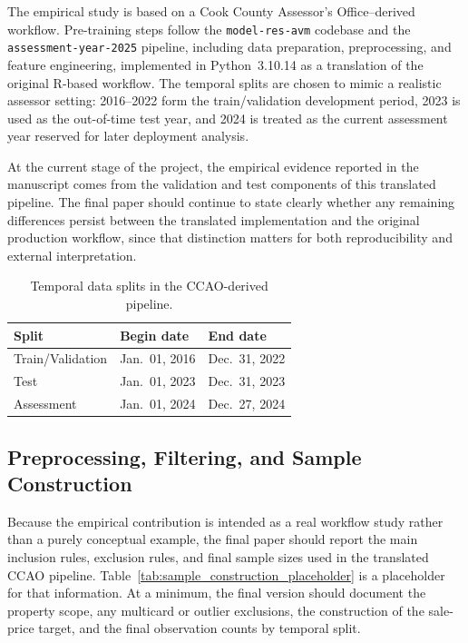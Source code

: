 \documentclass[12pt]{article}
\theoremstyle{plain}
\theoremstyle{definition}
\begin{document}
The empirical study is based on a Cook County Assessor's Office--derived workflow. Pre-training steps follow the \texttt{model-res-avm} codebase and the \texttt{assessment-year-2025} pipeline, including data preparation, preprocessing, and feature engineering, implemented in Python~3.10.14 as a translation of the original R-based workflow. The temporal splits are chosen to mimic a realistic assessor setting: 2016--2022 form the train/validation development period, 2023 is used as the out-of-time test year, and 2024 is treated as the current assessment year reserved for later deployment analysis.

At the current stage of the project, the empirical evidence reported in the manuscript comes from the validation and test components of this translated pipeline. The final paper should continue to state clearly whether any remaining differences persist between the translated implementation and the original production workflow, since that distinction matters for both reproducibility and external interpretation.

\begin{table}[t]
\centering
\caption{Temporal data splits in the CCAO-derived pipeline.}
\label{tab:data_splits}
\begin{tabular}{lll}
\toprule
Split & Begin date & End date \\
\midrule
Train/Validation & Jan.\ 01, 2016 & Dec.\ 31, 2022 \\
Test & Jan.\ 01, 2023 & Dec.\ 31, 2023 \\
Assessment & Jan.\ 01, 2024 & Dec.\ 27, 2024 \\
\bottomrule
\end{tabular}
\end{table}

\subsection{Preprocessing, Filtering, and Sample Construction}

Because the empirical contribution is intended as a real workflow study rather than a purely conceptual example, the final paper should report the main inclusion rules, exclusion rules, and final sample sizes used in the translated CCAO pipeline. Table~\ref{tab:sample_construction_placeholder} is a placeholder for that information. At a minimum, the final version should document the property scope, any multicard or outlier exclusions, the construction of the sale-price target, and the final observation counts by temporal split.
\end{document}
